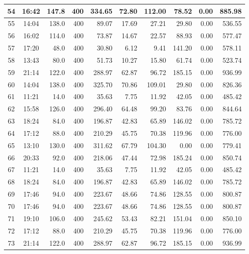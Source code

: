 \begin{landscape}
\begin{longtable}{|c|c|r|r|r|r|r|r|r|r|}
\hline
54 & 16:42 & 147.8 & 400 & 334.65 & 72.80 & 112.00 & 78.52 & 0.00 & 885.98 \\
\hline
\rowcolor{gray!8}
55 & 14:04 & 138.0 & 400 & 89.07 & 17.69 & 27.21 & 29.80 & 0.00 & 536.55 \\
\hline
56 & 16:02 & 114.0 & 400 & 73.87 & 14.67 & 22.57 & 88.93 & 0.00 & 577.47 \\
\hline
\rowcolor{gray!8}
57 & 17:20 & 48.0 & 400 & 30.80 & 6.12 & 9.41 & 141.20 & 0.00 & 578.11 \\
\hline
58 & 13:43 & 80.0 & 400 & 51.73 & 10.27 & 15.80 & 61.74 & 0.00 & 523.74 \\
\hline
\rowcolor{gray!8}
59 & 21:14 & 122.0 & 400 & 288.97 & 62.87 & 96.72 & 185.15 & 0.00 & 936.99 \\
\hline
60 & 14:04 & 138.0 & 400 & 325.70 & 70.86 & 109.01 & 29.80 & 0.00 & 826.36 \\
\hline
\rowcolor{gray!8}
61 & 11:21 & 14.0 & 400 & 35.63 & 7.75 & 11.92 & 42.05 & 0.00 & 485.42 \\
\hline
62 & 15:58 & 126.0 & 400 & 296.40 & 64.48 & 99.20 & 83.76 & 0.00 & 844.64 \\
\hline
\rowcolor{gray!8}
63 & 18:24 & 84.0 & 400 & 196.87 & 42.83 & 65.89 & 146.02 & 0.00 & 785.72 \\
\hline
64 & 17:12 & 88.0 & 400 & 210.29 & 45.75 & 70.38 & 119.96 & 0.00 & 776.00 \\
\hline
\rowcolor{gray!8}
65 & 13:10 & 130.0 & 400 & 311.62 & 67.79 & 104.30 & 0.00 & 0.00 & 779.41 \\
\hline
66 & 20:33 & 92.0 & 400 & 218.06 & 47.44 & 72.98 & 185.24 & 0.00 & 850.74 \\
\hline
\rowcolor{gray!8}
67 & 11:21 & 14.0 & 400 & 35.63 & 7.75 & 11.92 & 42.05 & 0.00 & 485.42 \\
\hline
68 & 18:24 & 84.0 & 400 & 196.87 & 42.83 & 65.89 & 146.02 & 0.00 & 785.72 \\
\hline
\rowcolor{gray!8}
69 & 17:46 & 94.0 & 400 & 223.67 & 48.66 & 74.86 & 128.55 & 0.00 & 800.87 \\
\hline
70 & 17:46 & 94.0 & 400 & 223.67 & 48.66 & 74.86 & 128.55 & 0.00 & 800.87 \\
\hline
\rowcolor{gray!8}
71 & 19:10 & 106.0 & 400 & 245.62 & 53.43 & 82.21 & 151.04 & 0.00 & 850.10 \\
\hline
72 & 17:12 & 88.0 & 400 & 210.29 & 45.75 & 70.38 & 119.96 & 0.00 & 776.00 \\
\hline
\rowcolor{gray!8}
73 & 21:14 & 122.0 & 400 & 288.97 & 62.87 & 96.72 & 185.15 & 0.00 & 936.99 \\

\end{longtable}
\end{landscape}
